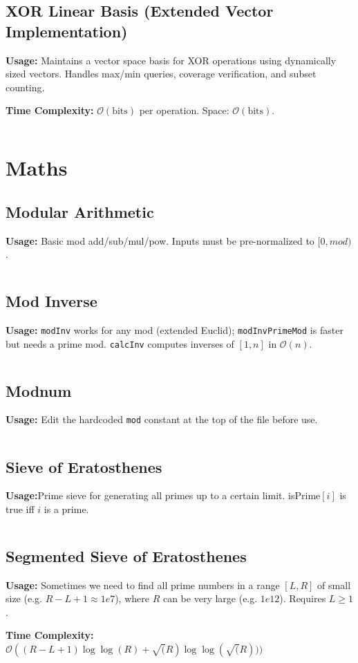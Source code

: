   \subsection{XOR Linear Basis (Extended Vector Implementation)}
    \par \textbf{Usage:} Maintains a vector space basis for XOR operations using dynamically sized vectors. Handles max/min queries, coverage verification, and subset counting.
    \par \textbf{Time Complexity:} $\mathcal{O}(\text{bits})$ per operation. Space: $\mathcal{O}(\text{bits})$.
    \inputminted{cpp}{library/structures/xor_basis.cpp}

\section{Maths}
  \subsection{Modular Arithmetic}
    \par \textbf{Usage:} Basic mod add/sub/mul/pow. Inputs must be pre-normalized to $[0, mod)$.
    \inputminted{cpp}{library/maths/mod.hpp}
  \subsection{Mod Inverse}
    \par \textbf{Usage:} \texttt{modInv} works for any mod (extended Euclid); \texttt{modInvPrimeMod} is faster but needs a prime mod. \texttt{calcInv} computes inverses of $[1, n]$ in $\mathcal{O}(n)$.
    \inputminted{cpp}{library/maths/mod_inverse.hpp}
  \subsection{Modnum}
    \par \textbf{Usage:} Edit the hardcoded \texttt{mod} constant at the top of the file before use.
    \inputminted{cpp}{library/maths/modnum.hpp}
  \subsection{Sieve of Eratosthenes}
    \par \textbf{Usage:}Prime sieve for generating all primes up to a certain limit. isPrime$[i]$ is true iff $i$ is a prime.
    \inputminted{cpp}{library/maths/sieve.cpp}
  \subsection{Segmented Sieve of Eratosthenes}
    \par \textbf{Usage:} Sometimes we need to find all prime numbers in a range $[L, R]$ of small size (e.g. $R - L + 1 \approx 1e7$), where $R$ can be very large (e.g. $1e12$). Requires $L \geq 1$.
%
    \par \textbf{Time Complexity:} $\mathcal{O}((R - L + 1)\log \log(R) + \sqrt(R) \log \log(\sqrt(R)))$
    \inputminted{cpp}{library/maths/segmented_sieve.cpp}

